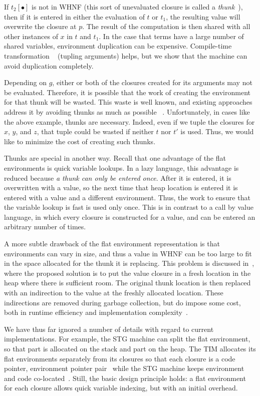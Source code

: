 If $t_2[\bullet]$ is not in WHNF (this sort of unevaluated closure is called a
\emph{thunk}~\cite{ingerman1961way,peyton1992implementing}), then if it is
entered in either the evaluation of $t$ or $t_1$, the resulting value will
overwrite the closure at $p$. The result of the computation is then shared with
all other instances of $x$ in $t$ and $t_1$. In the case that terms have a large
number of shared variables, environment duplication can be expensive.
Compile-time transformation ~\cite{peyton1992implementing} (tupling arguments)
helps, but we show that the machine can avoid duplication completely.

Depending on $g$, either or both of the closures created for its arguments may
not be evaluated.  Therefore, it is possible that the work of creating the
environment for that thunk will be wasted. This waste is well known, and
existing approaches address it by avoiding thunks as much as possible
~\cite{jonesstg,johnsson1984efficient}. Unfortunately, in cases like the above
example, thunks are necessary. Indeed, even if we tuple the closures for $x$,
$y$, and $z$, that tuple could be wasted if neither $t$ nor $t'$ is used. Thus,
we would like to minimize the cost of creating such thunks.

Thunks are special in another way.  Recall that one advantage of the flat
environments is quick variable lookups. In a lazy language, this advantage is
reduced because \emph{a thunk can only be entered once}. After it is entered, it
is overwritten with a value, so the next time that heap location is entered it
is entered with a value and a different environment. Thus, the work to ensure
that the variable lookup is fast is used only once. This is in contrast to
a call by value language, in which every closure is constructed for a value,
and can be entered an arbitrary number of times. 

A more subtle drawback of the flat environment representation is that
environments can vary in size, and thus a value in WHNF can be too large to fit
in the space allocated for the thunk it is replacing. This problem is discussed
in~\cite{jonesstg}, where the proposed solution is to put the value closure in
a fresh location in the heap where there is sufficient room. The original
thunk location is then replaced with an indirection to the value at the freshly
allocated location. These indirections are removed during garbage collection,
but do impose some cost, both in runtime efficiency and implementation
complexity~\cite{jonesstg}.

We have thus far ignored a number of details with regard to current
implementations. For example, the STG machine can split the flat environment, so
that part is allocated on the stack and part on the heap.  The TIM allocates its
flat environments separately from its closures so that each closure is a code
pointer, environment pointer pair~\cite{TIM} while the STG machine keeps
environment and code co-located~\cite{jonesstg}. Still, the basic design
principle holds: a flat environment for each closure allows quick variable
indexing, but with an initial overhead.

